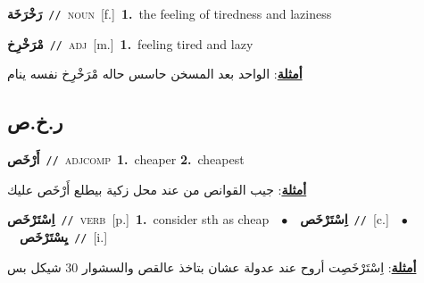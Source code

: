 \documentclass[10pt,a4paper,twoside]{article} %
\begin{document}
\begin{multicols}{2}
{\setlength\topsep{0pt}\textbf{\foreignlanguage{arabic}{رَخْرَخَة}}\ {\color{gray}\texttt{//}\color{black}}\ \textsc{noun}\ [f.]\ \textbf{1.}~the feeling of tiredness and laziness\ } \vspace{2mm}

{\setlength\topsep{0pt}\textbf{\foreignlanguage{arabic}{مْرَخْرِخ}}\ {\color{gray}\texttt{//}\color{black}}\ \textsc{adj}\ [m.]\ \textbf{1.}~feeling tired and lazy\  \begin{flushright}\color{gray}\foreignlanguage{arabic}{\textbf{\underline{\foreignlanguage{arabic}{أمثلة}}}: الواحد بعد المسخن حاسس حاله مْرَخْرِخ نفسه ينام}\end{flushright}\color{black}} \vspace{2mm}

\vspace{-3mm}
\subsection*{\color{blue}\foreignlanguage{arabic}{ر.خ.ص}\color{blue}{}} 

{\setlength\topsep{0pt}\textbf{\foreignlanguage{arabic}{أَرْخَص}}\ {\color{gray}\texttt{//}\color{black}}\ \textsc{adj\textunderscore comp}\ \textbf{1.}~cheaper  \textbf{2.}~cheapest\  \begin{flushright}\color{gray}\foreignlanguage{arabic}{\textbf{\underline{\foreignlanguage{arabic}{أمثلة}}}: جيب القوانص من عند محل زكية بيطلع أَرْخَص عليك}\end{flushright}\color{black}} \vspace{2mm}

{\setlength\topsep{0pt}\textbf{\foreignlanguage{arabic}{اِسْتَرْخَص}}\ {\color{gray}\texttt{//}\color{black}}\ \textsc{verb}\ [p.]\ \textbf{1.}~consider sth as cheap\ \ $\bullet$\ \ \setlength\topsep{0pt}\textbf{\foreignlanguage{arabic}{اِسْتَرْخَص}}\ {\color{gray}\texttt{//}\color{black}}\ [c.]\ \ $\bullet$\ \ \setlength\topsep{0pt}\textbf{\foreignlanguage{arabic}{يِسْتَرْخَص}}\ {\color{gray}\texttt{//}\color{black}}\ [i.]\  \begin{flushright}\color{gray}\foreignlanguage{arabic}{\textbf{\underline{\foreignlanguage{arabic}{أمثلة}}}: اِسْتَرْخَصِت أروح عند عدولة عشان بتاخذ عالقص والسشوار 30 شيكل بس}\end{flushright}\color{black}} \vspace{2mm}


\end{multicols}
\end{document}
